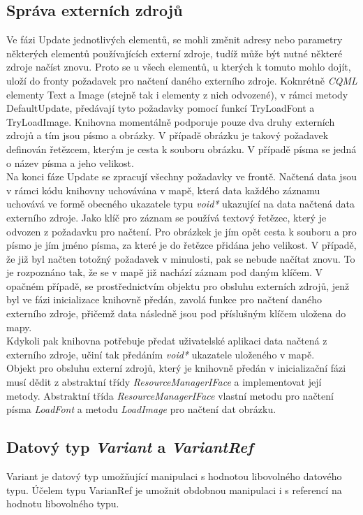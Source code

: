 \documentclass[11pt,twoside,a4paper]{book}
\begin{document}
{{\begin{ttemize}
{{\begin{lastlisting}[frame=single,caption=Řešení v pseudokódu problematického použití operátoru "." v přiřazovacím výroku,label=lst:var0N]
\subsection{Správa externích zdrojů}
Ve fázi Update jednotlivých elementů, se mohli změnit adresy nebo parametry některých elementů používajících externí zdroje, tudíž může být nutné některé zdroje načíst znovu. Proto se u všech elementů, u kterých k tomuto mohlo dojít, uloží do fronty požadavek pro načtení daného externího zdroje. Koknrétně \textit{CQML} elementy Text a Image (stejně tak i elementy z nich odvozené), v rámci metody DefaultUpdate, předávají tyto požadavky pomocí funkcí TryLoadFont a TryLoadImage. Knihovna momentálně podporuje pouze dva druhy externích zdrojů a tím jsou písmo a obrázky. V případě obrázku je takový požadavek definován řetězcem, kterým je cesta k souboru obrázku. V případě písma se jedná o název písma a jeho velikost. \\
Na konci fáze Update se zpracují všechny požadavky ve frontě. Načtená data jsou v rámci kódu knihovny uchovávána v mapě, která data každého záznamu uchovává ve formě obecného ukazatele typu \textit{void*} ukazující na data načtená data externího zdroje. Jako klíč pro záznam se používá textový řetězec, který je odvozen z požadavku pro načtení. Pro obrázkek je jím opět cesta k souboru a pro písmo je jím jméno písma, za které je do řetězce přidána jeho velikost. V případě, že již byl načten totožný požadavek v minulosti, pak se nebude načítat znovu. To je rozpoznáno tak, že se v mapě již nachází záznam pod daným klíčem. V opačném případě, se prostřednictvím objektu pro obsluhu externích zdrojů, jenž byl ve fázi inicializace knihovně předán, zavolá funkce pro načtení daného externího zdroje, přičemž data následně jsou pod příslušným klíčem uložena do mapy.\\
Kdykoli pak knihovna potřebuje předat uživatelské aplikaci data načtená z externího zdroje, učiní tak předáním \textit{void*} ukazatele uloženého v mapě.\\
Objekt pro obsluhu externí zdrojů, který je knihovně předán v inicializační fázi musí dědit z abstraktní třídy \textit{ResourceManagerIFace} a implementovat její metody. Abstraktní třída \textit{ResourceManagerIFace} vlastní metodu pro načtení písma \textit{LoadFont} a metodu \textit{LoadImage} pro načtení dat obrázku.

\subsection{Datový typ \textit{Variant} a \textit{VariantRef}}
Variant je datový typ umožňující manipulaci s hodnotou libovolného datového typu. Účelem typu VarianRef je umožnit obdobnou manipulaci i s referencí na hodnotu libovolného typu.\\


\end{lastlisting}}}
\end{ttemize}}}
\end{document}
